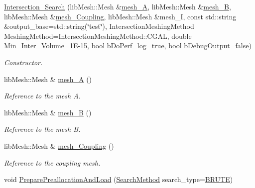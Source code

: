 \begin{DoxyCompactItemize}
\item 
\hyperlink{classcarl_1_1_intersection___search_a84339f042e025cf5603b8ef1cb9ecba5}{Intersection\+\_\+\+Search} (lib\+Mesh\+::\+Mesh \&\hyperlink{classcarl_1_1_intersection___search_aaea90014de60041ab930ad10afe8b694}{mesh\+\_\+\+A}, lib\+Mesh\+::\+Mesh \&\hyperlink{classcarl_1_1_intersection___search_a211e0e64653fd099eaacac0ee3824a7d}{mesh\+\_\+\+B}, lib\+Mesh\+::\+Mesh \&\hyperlink{classcarl_1_1_intersection___search_ae4d3f5cd22b551d7f33a8d807649ac4c}{mesh\+\_\+\+Coupling}, lib\+Mesh\+::\+Mesh \&mesh\+\_\+\+I, const std\+::string \&output\+\_\+base=std\+::string(\char`\"{}test\char`\"{}), Intersection\+Meshing\+Method Meshing\+Method=Intersection\+Meshing\+Method\+::\+C\+G\+A\+L, double Min\+\_\+\+Inter\+\_\+\+Volume=1\+E-\/15, bool b\+Do\+Perf\+\_\+log=true, bool b\+Debug\+Output=false)
\begin{DoxyCompactList}\small\item\em Constructor. \end{DoxyCompactList}\item 
lib\+Mesh\+::\+Mesh \& \hyperlink{classcarl_1_1_intersection___search_aaea90014de60041ab930ad10afe8b694}{mesh\+\_\+\+A} ()
\begin{DoxyCompactList}\small\item\em Reference to the mesh A. \end{DoxyCompactList}\item 
lib\+Mesh\+::\+Mesh \& \hyperlink{classcarl_1_1_intersection___search_a211e0e64653fd099eaacac0ee3824a7d}{mesh\+\_\+\+B} ()
\begin{DoxyCompactList}\small\item\em Reference to the mesh B. \end{DoxyCompactList}\item 
lib\+Mesh\+::\+Mesh \& \hyperlink{classcarl_1_1_intersection___search_ae4d3f5cd22b551d7f33a8d807649ac4c}{mesh\+\_\+\+Coupling} ()
\begin{DoxyCompactList}\small\item\em Reference to the coupling mesh. \end{DoxyCompactList}\item 
void \hyperlink{classcarl_1_1_intersection___search_aa2312fdcb8d8203f9d07b2b638c62798}{Prepare\+Preallocation\+And\+Load} (\hyperlink{namespacecarl_a2c9d0282cb533624e034ccc1d7b629c7}{Search\+Method} search\+\_\+type=\hyperlink{namespacecarl_a2c9d0282cb533624e034ccc1d7b629c7a795a195e14566a465c90e47e4f389447}{B\+R\+U\+T\+E})

\end{DoxyCompactItemize}
